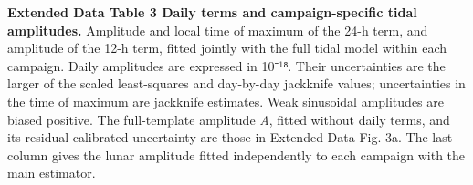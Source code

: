 \documentclass[
  11pt,
  a4paper,
]{article}
\begin{document}
\par\noindent\begin{minipage}[t]{\linewidth}\vspace{0pt}\singlespacing\small\nolinenumbers

\textbf{Extended Data Table 3 \textbar{} Daily terms and
campaign-specific tidal amplitudes.} Amplitude and local time of maximum
of the 24-h term, and amplitude of the 12-h term, fitted jointly with
the full tidal model within each campaign. Daily amplitudes are
expressed in 10⁻¹⁸. Their uncertainties are the larger of the scaled
least-squares and day-by-day jackknife values; uncertainties in the time
of maximum are jackknife estimates. Weak sinusoidal amplitudes are
biased positive. The full-template amplitude \emph{A}, fitted without
daily terms, and its residual-calibrated uncertainty are those in
Extended Data Fig. 3a. The last column gives the lunar amplitude fitted
independently to each campaign with the main estimator.


\end{minipage}
\end{document}
